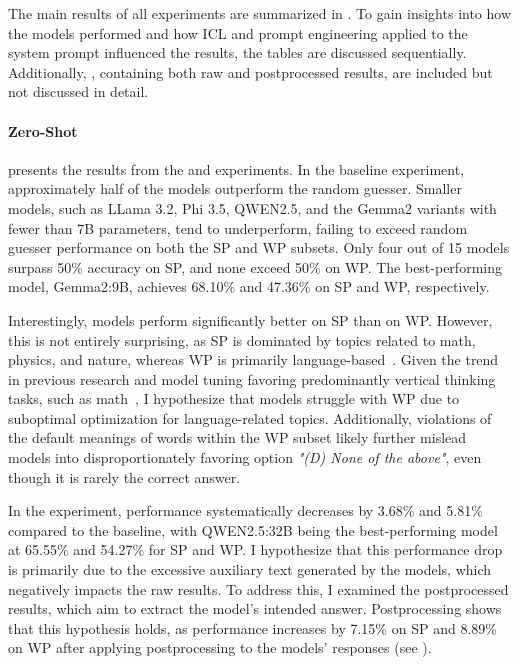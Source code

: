 The main results of all experiments are summarized in . To gain insights into how the models performed and how \acf{ICL} and prompt engineering applied to the system prompt influenced the results, the tables are discussed sequentially. Additionally, , containing both raw and postprocessed results, are included but not discussed in detail.

\paragraph{Zero-Shot}
\label{par:zero-shot}

 presents the results from the  and  experiments. In the baseline experiment, approximately half of the models outperform the random guesser. Smaller models, such as LLama 3.2, Phi 3.5, QWEN2.5, and the Gemma2 variants with fewer than 7B parameters, tend to underperform, failing to exceed random guesser performance on both the \ac{SP} and \ac{WP} subsets. Only four out of 15 models surpass 50\% accuracy on \ac{SP}, and none exceed 50\% on \ac{WP}. The best-performing model, Gemma2:9B, achieves 68.10\% and 47.36\% on \ac{SP} and \ac{WP}, respectively.

Interestingly, models perform significantly better on \ac{SP} than on \ac{WP}. However, this is not entirely surprising, as \ac{SP} is dominated by topics related to math, physics, and nature, whereas \ac{WP} is primarily language-based~\cite{jiangBRAINTEASERLateralThinking2023}. Given the trend in previous research and model tuning favoring predominantly vertical thinking tasks, such as math~\cite{jiangBRAINTEASERLateralThinking2023,jiangSemEval2024Task92024}, I hypothesize that models struggle with \ac{WP} due to suboptimal optimization for language-related topics. Additionally, violations of the default meanings of words within the \ac{WP} subset likely further mislead models into disproportionately favoring option \textit{"(D) None of the above"}, even though it is rarely the correct answer.

In the  experiment, performance systematically decreases by 3.68\% and 5.81\% compared to the baseline, with QWEN2.5:32B being the best-performing model at 65.55\% and 54.27\% for \ac{SP} and \ac{WP}. I hypothesize that this performance drop is primarily due to the excessive auxiliary text generated by the models, which negatively impacts the raw results. To address this, I examined the postprocessed results, which aim to extract the model's intended answer. Postprocessing shows that this hypothesis holds, as performance increases by 7.15\% on \ac{SP} and 8.89\% on \ac{WP} after applying postprocessing to the models' responses (see ).

